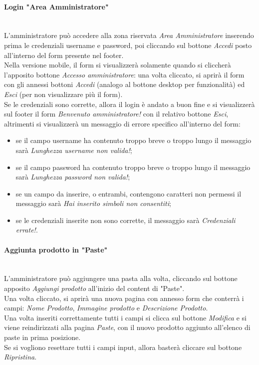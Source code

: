 \paragraph{Login "Area Amministratore"}\mbox{}\\
\label{par:LoginAA}
L'amministratore può accedere alla zona riservata \emph{Area Amministratore} inserendo prima le credenziali username e password, poi cliccando sul bottone \emph{Accedi} 
posto all'interno del form presente nel footer.\\ 
Nella versione mobile, il form si visualizzerà solamente quando si cliccherà l'apposito bottone \emph{Accesso amministratore}: una volta cliccato, si aprirà il form con 
gli annessi bottoni \emph{Accedi} (analogo al bottone desktop per funzionalità) ed \emph{Esci} (per non visualizzare più il form).\\ 
Se le credenziali sono corrette, allora il login è andato a buon fine e si visualizzerà sul footer il form \emph{Benvenuto amministratore!} con il relativo bottone \emph{Esci}, 
altrimenti si visualizzerà un messaggio di errore specifico all'interno del form:
\begin{itemize}
	\item se il campo username ha contenuto troppo breve o troppo lungo il messaggio sarà \emph{Lunghezza username non valida!};
	\item se il campo password ha contenuto troppo breve o troppo lungo il messaggio sarà \emph{Lunghezza password non valida!};
	\item se un campo da inserire, o entrambi, contengono caratteri non permessi il messaggio sarà \emph{Hai inserito simboli non consentiti};
	\item se le credenziali inserite non sono corrette, il messaggio sarà \emph{Credenziali errate!}.
\end{itemize}

\paragraph{Aggiunta prodotto in "Paste"}\mbox{}\\
\label{par:AddP}
L'amministratore può aggiungere una pasta alla volta, cliccando sul bottone apposito \emph{Aggiungi prodotto} all'inizio del content di "Paste".\\ 
Una volta cliccato, si aprirà una nuova pagina con annesso form che conterrà i campi: \emph{Nome Prodotto}, \emph{Immagine prodotto} e \emph{Descrizione Prodotto}.\\ 
Una volta inseriti correttamente tutti i campi si clicca sul bottone \emph{Modifica} e si viene reindirizzati alla pagina \emph{Paste}, con il nuovo prodotto 
aggiunto all'elenco di paste in prima posizione.\\
Se si vogliono resettare tutti i campi input, allora basterà cliccare sul bottone \emph{Ripristina}.

